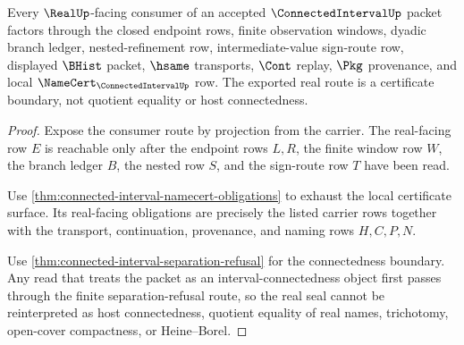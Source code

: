 \begin{theorem}
\label{thm:connected-interval-real-route}
Every $\RealUp$-facing consumer of an accepted $\ConnectedIntervalUp$ packet factors through the closed endpoint rows, finite observation windows, dyadic branch ledger, nested-refinement row, intermediate-value sign-route row, displayed $\BHist$ packet, $\hsame$ transports, $\Cont$ replay, $\Pkg$ provenance, and local $\NameCert_{\ConnectedIntervalUp}$ row. The exported real route is a certificate boundary, not quotient equality or host connectedness.
\end{theorem}
\begin{proof}
Expose the consumer route by projection from the carrier. The real-facing row $E$ is reachable only after the endpoint rows $L,R$, the finite window row $W$, the branch ledger $B$, the nested row $S$, and the sign-route row $T$ have been read.

Use \autoref{thm:connected-interval-namecert-obligations} to exhaust the local certificate surface. Its real-facing obligations are precisely the listed carrier rows together with the transport, continuation, provenance, and naming rows $H,C,P,N$.

Use \autoref{thm:connected-interval-separation-refusal} for the connectedness boundary. Any read that treats the packet as an interval-connectedness object first passes through the finite separation-refusal route, so the real seal cannot be reinterpreted as host connectedness, quotient equality of real names, trichotomy, open-cover compactness, or Heine--Borel.
\end{proof}

